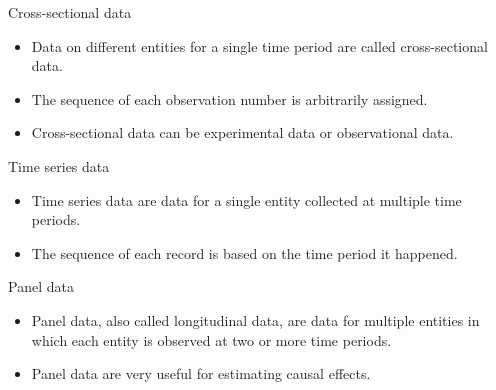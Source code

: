 \documentclass[presentation]{beamer}
\begin{document}
\begin{frame}[label={sec:orgb5b9ef3}]{Cross-sectional data}
\begin{itemize}
\item Data on different entities for a single time period are called
\alert{cross-sectional data}.
\item The sequence of each observation number is arbitrarily assigned.
\item Cross-sectional data can be experimental data or observational data.
\end{itemize}
\end{frame}


\begin{frame}[label={sec:org4660e77}]{Time series data}
\begin{itemize}
\item Time series data are data for a single entity collected at multiple
time periods.
\item The sequence of each record is based on the time period
it happened.
\end{itemize}
\end{frame}


\begin{frame}[label={sec:org8c2ed57}]{Panel data}
\begin{itemize}
\item \alert{Panel data}, also called \alert{longitudinal data}, are data for multiple
entities in which \alert{each entity} is observed at two or more time
periods.
\item Panel data are very useful for estimating causal effects.
\end{itemize}
\end{frame}
\end{document}
